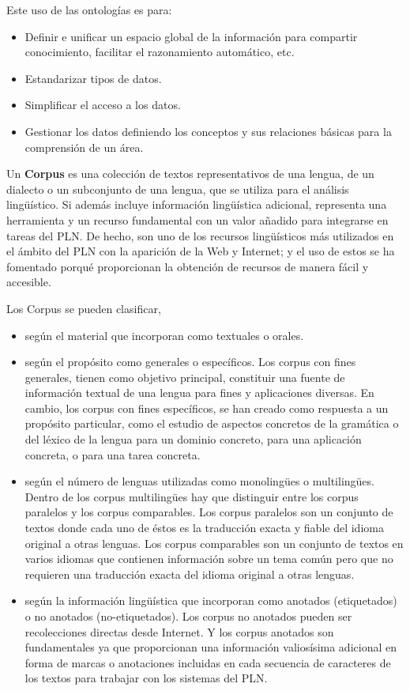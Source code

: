 \documentclass[11pt]{exam}
\begin{document}
\begin{questions}
Este uso de las ontologías es para:

\begin{itemize}
	\item Definir e unificar un espacio global de la información para compartir conocimiento, facilitar el razonamiento automático, etc.
	\item Estandarizar tipos de datos.
	\item Simplificar el acceso a los datos.
	\item Gestionar los datos definiendo los conceptos y sus relaciones básicas para la comprensión de un área.
\end{itemize}

Un {\bf Corpus} es una colección de textos representativos de una lengua, de un dialecto o un subconjunto de una lengua, que se utiliza para el análisis lingüístico. Si además incluye información lingüística adicional, representa una herramienta y un recurso fundamental con un valor añadido para integrarse en tareas del PLN. De hecho, son uno de los recursos lingüísticos más utilizados en el ámbito del PLN con la aparición de la Web y Internet; y el uso de estos se ha fomentado porqué proporcionan la obtención de recursos de manera fácil y accesible.

Los Corpus se pueden clasificar,

\begin{itemize}
	\item según el material que incorporan como textuales o orales.
	\item según el propósito como generales o específicos.
		\subitem Los corpus con fines generales, tienen como objetivo principal, constituir una fuente de información textual de una lengua para fines y aplicaciones diversas.
		\subitem En cambio, los corpus con fines específicos, se han creado como respuesta a un propósito particular, como el
		estudio de aspectos	concretos de la gramática o	del léxico de la lengua para un	dominio concreto, para una aplicación concreta, o para una tarea concreta.
	\item según el número de lenguas utilizadas como monolingües o multilingües. Dentro de los corpus multilingües hay que distinguir entre los corpus paralelos y los corpus comparables.
		\subitem Los corpus paralelos son un conjunto de textos donde cada uno de éstos es la traducción exacta y fiable del idioma original a otras lenguas.
		\subitem Los corpus comparables son un conjunto de textos en varios idiomas que contienen información sobre un tema común pero que no requieren una traducción exacta del idioma original a otras lenguas.
	\item según la información lingüística que incorporan como anotados (etiquetados) o no anotados (no-etiquetados). Los corpus no anotados pueden ser recolecciones directas desde Internet. Y los corpus anotados son fundamentales ya que proporcionan una información valiosísima adicional en forma de marcas o anotaciones incluidas en cada secuencia de	caracteres de los textos para trabajar con los sistemas del PLN.
\end{itemize}


\end{questions}
\end{document}
